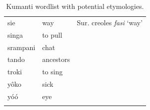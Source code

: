 \begin{longtable}[c]{ p{} p{} p{} }
    sie             & way           & Sur. creoles \textit{fasi} `way'  \\
    singa           & to pull       &  \\
    srampani        & chat          &  \\
    tando           & ancestors     &  \\
    troki           & to sing       &  \\
    yôko            & sick          &  \\
    yóó             & eye           &  \\
    \hline
    \caption{Kumanti wordlist with potential etymologies.}\label{tab:kumanti}
    \end{longtable}
